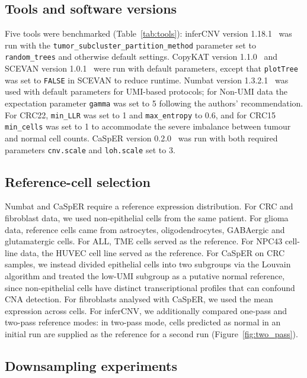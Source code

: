 \documentclass[11pt]{article}
\begin{document}
\subsection{Tools and software versions}

Five tools were benchmarked (Table~\ref{tab:tools}): inferCNV version
1.18.1~\cite{tickle2019infercnv} was run with the
\texttt{tumor\_subcluster\_partition\_method} parameter set to
\texttt{random\_trees} and otherwise default settings. CopyKAT version
1.1.0~\cite{gao2021copykat} and SCEVAN version 1.0.1~\cite{defalco2023scevan}
were run with default parameters, except that \texttt{plotTree} was set to
\texttt{FALSE} in SCEVAN to reduce runtime. Numbat version
1.3.2.1~\cite{gao2023numbat} was used with default parameters for UMI-based
protocols; for Non-UMI data the expectation parameter \texttt{gamma} was set
to 5 following the authors' recommendation. For CRC22, \texttt{min\_LLR} was
set to 1 and \texttt{max\_entropy} to 0.6, and for CRC15 \texttt{min\_cells}
was set to 1 to accommodate the severe imbalance between tumour and normal
cell counts. CaSpER version 0.2.0~\cite{serin2020casper} was run with both
required parameters \texttt{cnv.scale} and \texttt{loh.scale} set to 3.

\subsection{Reference-cell selection}

Numbat and CaSpER require a reference expression distribution. For CRC and
fibroblast data, we used non-epithelial cells from the same patient. For
glioma data, reference cells came from astrocytes, oligodendrocytes, GABAergic
and glutamatergic cells. For ALL, TME cells served as the reference. For
NPC43 cell-line data, the HUVEC cell line served as the reference. For CaSpER
on CRC samples, we instead divided epithelial cells into two subgroups via
the Louvain algorithm and treated the low-UMI subgroup as a putative normal
reference, since non-epithelial cells have distinct transcriptional profiles
that can confound CNA detection. For fibroblasts analysed with CaSpER, we used
the mean expression across cells. For inferCNV, we additionally compared
one-pass and two-pass reference modes: in two-pass mode, cells predicted as
normal in an initial run are supplied as the reference for a second run
(Figure~\ref{fig:two_pass}).

\subsection{Downsampling experiments}
\end{document}

